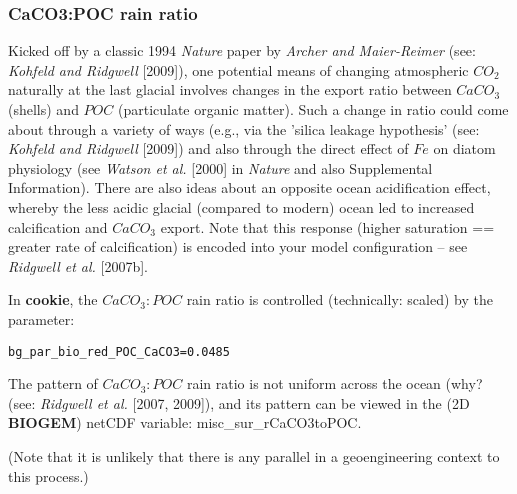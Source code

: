 
\subsubsection*{CaCO3:POC rain ratio}

\vspace{2mm}
Kicked off by a classic 1994 \textit{Nature} paper by \textit{Archer and Maier-Reimer} (see: \textit{Kohfeld and Ridgwell} [2009]), one potential means of changing atmospheric \(CO_{2}\) naturally at the last glacial involves changes in the export ratio between \(CaCO_{3}\) (shells) and \(POC\) (particulate organic matter). Such a change in ratio could come about through a variety of ways (e.g., via the 'silica leakage hypothesis' (see: \textit{Kohfeld and Ridgwell} [2009]) and also through the direct effect of \(Fe\) on diatom physiology (see \textit{Watson et al.} [2000] in \textit{Nature} and also Supplemental Information). There are also ideas about an opposite ocean acidification effect, whereby the less acidic glacial (compared to modern) ocean led to increased calcification and \(CaCO_{3}\) export. Note that this response (higher saturation == greater rate of calcification) is encoded into your model configuration – see \textit{Ridgwell et al.} [2007b].

\vspace{1mm}
In \textbf{cookie}, the \(CaCO_{3}:POC\) rain ratio is controlled (technically: scaled) by the parameter:
\vspace{-1mm}\small\begin{verbatim}
bg_par_bio_red_POC_CaCO3=0.0485
\end{verbatim}\normalsize\vspace{-1mm}

The pattern of \(CaCO_{3}:POC\) rain ratio is not uniform across the ocean (why? (see: \textit{Ridgwell et al.} [2007, 2009]), and its pattern can be viewed in the (2D \textbf{BIOGEM}) netCDF variable: \textsf{\footnotesize misc\_sur\_rCaCO3toPOC}.

(Note that it is unlikely that there is any parallel in a geoengineering context to this process.)

